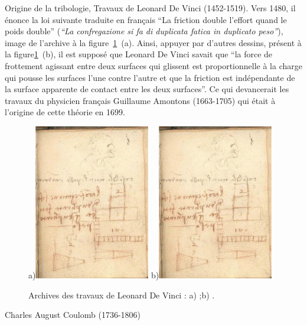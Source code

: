 Origine de la tribologie, Travaux de Leonard De Vinci (1452-1519). Vers 1480, il énonce la loi suivante traduite en français “La friction double l’effort quand le poids double” (\textit{“La confregazione si fa di duplicata fatica in duplicato peso”}), image de l'archive à la figure~\ref{LeonardDeVinci}~(a). Ainsi, appuyer par d'autres dessins, présent à la figure\ref{LeonardDeVinci}~(b), il est supposé que Leonard De Vinci savait que “la force de frottement agissant entre deux surfaces qui glissent est proportionnelle à la charge qui pousse les surfaces l’une contre l'autre et que la friction est indépendante de la surface apparente de contact entre les deux surfaces”. Ce qui devancerait les travaux du physicien français Guillaume Amontons (1663-1705) qui était à l’origine de cette théorie en 1699.\par
\begin{figure}[!h]
\begin{center}
a)\includegraphics[width=0.45\textwidth]{Photos/LeonardDeVinci_friction_1}\hspace{0.5mm}
b)\includegraphics[width=0.45\textwidth]{Photos/LeonardDeVinci_friction_1}\hspace{0.5mm}
\end{center}
\caption{Archives des travaux de Leonard De Vinci : a) ;b) .}
\label{LeonardDeVinci}
\end{figure}
Charles August Coulomb (1736-1806)  

